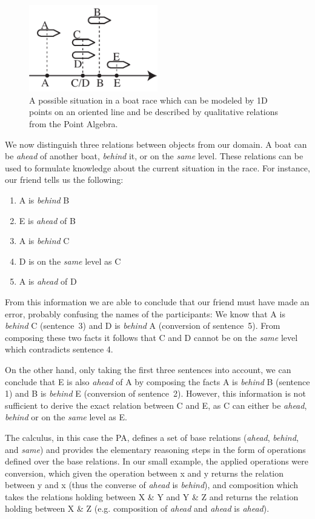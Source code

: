 \documentclass[headsepline]{scrreprt}
\theoremstyle{definition}
\begin{document}
\begin{figure}[ht]
	\centering
	\includegraphics[width=0.5\textwidth]{boatrace_cn_0}
	\caption{A possible situation in a boat race which can be modeled by 1D points on an oriented line and be described by qualitative relations from the Point Algebra.}
	\label{fig:br0}
\end{figure}

We now distinguish three relations between objects from
our domain. A boat can be \emph{ahead} of another boat, \emph{behind} it,
or on the \emph{same} level. These relations can be used to formulate
knowledge about the current situation in the race. For instance, our
friend tells us the following:

\begin{enumerate}
\item A is \emph{behind} B
\item E is \emph{ahead} of B
\item A is \emph{behind} C
\item D is on the \emph{same} level as C
\item A is \emph{ahead} of D
\end{enumerate}
From this information we are able to conclude that our friend must have
made an error, probably confusing the names of the participants: We know
that A is \emph{behind} C (sentence~3) and D is \emph{behind} A (conversion of sentence~5). From
composing these two facts it follows that C and D cannot be on the \emph{same}
level which contradicts sentence 4.

On the other hand, only taking the first three sentences into account, we can conclude that E
is also \emph{ahead} of A by composing
the facts A is \emph{behind} B (sentence 1) and B is \emph{behind} E (conversion of sentence~2).
However, this information is not sufficient to derive the exact
relation
between C and E, as C can either be \emph{ahead}, \emph{behind} or on the {\em
same} level as E.

The calculus, in this case the PA, defines a set of base relations
(\emph{ahead}, \emph{behind}, and \emph{same}) and
provides the elementary reasoning steps in the form of operations defined
over the base relations. In our small example, the applied
operations were conversion, which given the operation between x and y returns
the relation between y and x (thus the converse of \emph{ahead} is
\emph{behind}), and composition which takes the relations holding
between X \& Y and Y \& Z and returns the relation holding between X \& Z (e.g.
composition of \emph{ahead} and \emph{ahead} is \emph{ahead}).
\end{document}

